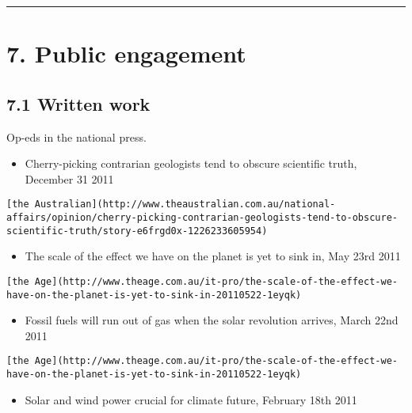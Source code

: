 \documentclass[
]{article}
\providecommand{\tightlist}{%
  \setlength{\itemsep}{0pt}\setlength{\parskip}{0pt}}
\begin{document}
\begin{center}\rule{0.5\linewidth}{0.5pt}\end{center}

\hypertarget{public-engagement}{%
\section{7. Public engagement}\label{public-engagement}}

\hypertarget{written-work}{%
\subsection{7.1 Written work}\label{written-work}}

Op-eds in the national press.

\begin{itemize}
\tightlist
\item
  Cherry-picking contrarian geologists tend to obscure scientific truth,
  December 31 2011
\end{itemize}

\begin{verbatim}
[the Australian](http://www.theaustralian.com.au/national-affairs/opinion/cherry-picking-contrarian-geologists-tend-to-obscure-scientific-truth/story-e6frgd0x-1226233605954)
\end{verbatim}

\begin{itemize}
\tightlist
\item
  The scale of the effect we have on the planet is yet to sink in, May
  23rd 2011
\end{itemize}

\begin{verbatim}
[the Age](http://www.theage.com.au/it-pro/the-scale-of-the-effect-we-have-on-the-planet-is-yet-to-sink-in-20110522-1eyqk)
\end{verbatim}

\begin{itemize}
\tightlist
\item
  Fossil fuels will run out of gas when the solar revolution arrives,
  March 22nd 2011
\end{itemize}

\begin{verbatim}
[the Age](http://www.theage.com.au/it-pro/the-scale-of-the-effect-we-have-on-the-planet-is-yet-to-sink-in-20110522-1eyqk)
\end{verbatim}

\begin{itemize}
\tightlist
\item
  Solar and wind power crucial for climate future, February 18th 2011
\end{itemize}
\end{document}

